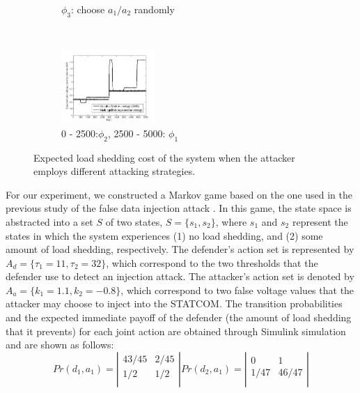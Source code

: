 \begin{figure}[t]
\begin{subfigure}[b]{0.3\textwidth}
                \caption{$\phi_3$: choose $a_1/a_2$ randomly}
                \label{fig:a1a2}
        \end{subfigure}~\hspace{-3em}
\begin{subfigure}[b]{0.3\textwidth}
  \centering
                \includegraphics[width=1.4in]{result5}
                \caption{0 - 2500:$\phi_2$, 2500 - 5000: $\phi_1$}
                \label{fig:a2a1}
        \end{subfigure}
  \caption{\scriptsize{Expected load shedding cost of the system when the attacker employs different attacking strategies.}}
  \label{fig:games} %
\end{figure}

For our experiment, we constructed a Markov game based on the one used in the previous study of the false data injection attack \cite{law2012security}. In this game, the state space is abstracted into a set $S$ of two states, $S=\{s_1, s_2\}$, where $s_1$ and $s_2$ represent the states in which the system experiences (1) no load shedding, and (2) some amount of load shedding, respectively. The defender's action set is represented by $A_d = \{\tau_1 = 11,\tau_2 = 32\}$, which correspond to the two thresholds that the defender use to detect an injection attack. The attacker's action set is denoted by $A_a =\{k_1 = 1.1, k_2 = -0.8\}$, which correspond to two false voltage values that the attacker may choose to inject into the STATCOM. The transition probabilities and the expected immediate payoff of the defender  (the amount of load shedding that it prevents) for each joint action are obtained through Simulink \cite{dabney2001mastering} simulation and are shown as follows:
\[ Pr(d_1,a_1) = \left| \begin{array}{cc}
 43/45 & 2/45  \\
 1/2 & 1/2  \\ \end{array} \right|
 Pr(d_2,a_1) = \left| \begin{array}{cc}
 0 & 1  \\
 1/47 & 46/47  \\ \end{array} \right|\]

